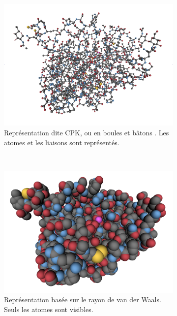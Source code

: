 \begin{figure}[H]
		~
		\begin{subfigure}[t]{\subImgW}
			\centering
			\includegraphics[width=\textwidth]{./figures/ch1/4awn_CPK}
			\caption{Représentation dite CPK, ou en \og boules et bâtons \fg{}. Les atomes et les liaisons sont représentés.}
			\label{fig:4awn_CPK}
		\end{subfigure}
		~
		\begin{subfigure}[t]{\subImgW}
			\centering
			\includegraphics[width=\textwidth]{./figures/ch1/4awn_vdW}
			\caption{Représentation basée sur le rayon de van der Waals. Seuls les atomes sont visibles.}
			\label{fig:4awn_VdW}
		\end{subfigure}
		~
		\begin{subfigure}[t]{\subImgW}
			\centering

\end{subfigure}
\end{figure}
